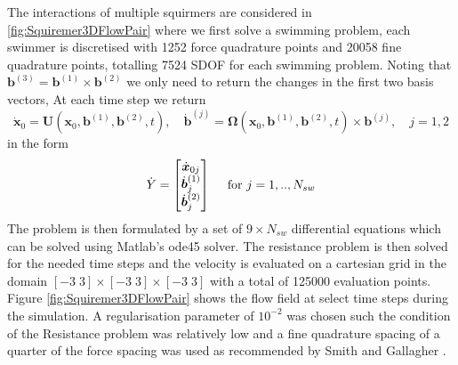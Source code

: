 The interactions of multiple squirmers are considered in \cref{fig:Squiremer3DFlowPair} where we first solve a swimming problem, each swimmer is discretised with 1252 force quadrature points and 20058 fine quadrature points, totalling 7524 SDOF for each swimming problem. Noting that $\bm{b}^{(3)} = \bm{b}^{(1)} \times \bm{b}^{(2)}$ we only need to return the changes in the first two basis vectors, At each time step we return 
\begin{equation*}
    {\dot{\bm{x}}}_{0}=\bm{U}\left(\bm{x}_{0}, \bm{b}^{(1)}, \bm{b}^{(2)}, t\right), \quad \dot{\bm{b}}^{(j)}=\bm{\Omega}\left(\bm{x}_{0}, \bm{b}^{(1)}, \bm{b}^{(2)}, t\right) \times \bm{b}^{(j)}, \quad j=1,2
\end{equation*}
in the form
\begin{equation*}
\arraycolsep=0.4pt\def\arraystretch{1}
\dot{Y} = \begin{bmatrix}
    {\dot{\bm{x}}_{0 j}} \\
    {\dot{\bm{b}}^{(1)}}_j \\
    {\dot{\bm{b}}^{(2)}}_j
\end{bmatrix} \quad \text{ for } j=1,..,N_{sw}
\end{equation*}
The problem is then formulated by a set of $9 \times N_{sw}$ differential equations which can be solved using Matlab's ode45 solver. The resistance problem is then solved for the needed time steps and the velocity is evaluated on a cartesian grid in the domain $[-3\; 3] \times [-3\; 3] \times [-3\; 3]$ with a total of 125000 evaluation points. Figure \ref{fig:Squiremer3DFlowPair} shows the flow field at select time steps during the simulation. A regularisation parameter of $10^{-2}$ was chosen such the condition of the Resistance problem was relatively low and a fine quadrature spacing of a quarter of the force spacing was used as recommended by Smith and Gallagher \cite{Gallagher2020}.  

